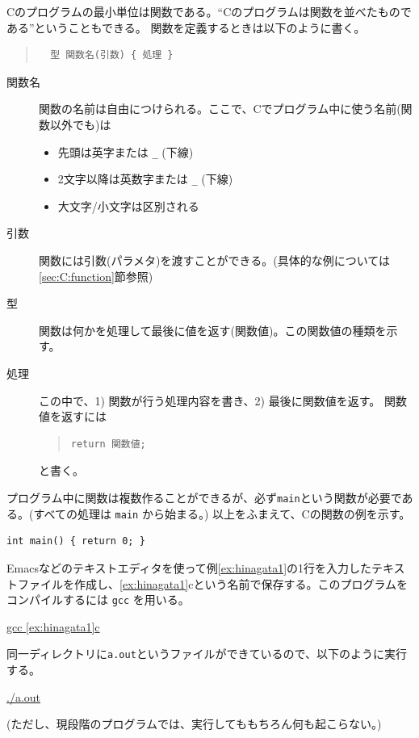Cのプログラムの最小単位は関数である。``Cのプログラムは関数を並べたものである''ということもできる。
関数を定義するときは以下のように書く。
%
\begin{quote}
  \begin{verbatim}
  型 関数名(引数) { 処理 }
  \end{verbatim}
\end{quote}
\begin{description}
\item[関数名] 関数の名前は自由につけられる。ここで、Cでプログラム中に使う名前(関数以外でも)は
  \begin{itemize}
  \item 先頭は英字または \verb+_+ (下線)
  \item 2文字以降は英数字または \verb+_+ (下線)
  \item 大文字/小文字は区別される
  \end{itemize}
\item[引数] 関数には引数(パラメタ)を渡すことができる。(具体的な例については\ref{sec:C:function}節参照)
\item[型] 関数は何かを処理して最後に値を返す(関数値)。この関数値の種類を示す。
\item[処理] この中で、1) 関数が行う処理内容を書き、2) 最後に関数値を返す。
  関数値を返すには
  \begin{quote}
\begin{verbatim}return 関数値;
\end{verbatim}
  \end{quote}
  と書く。
\end{description}
プログラム中に関数は複数作ることができるが、必ず\verb+main+という関数が必要である。(すべての処理は \verb+main+ から始まる。) 以上をふまえて、Cの関数の例を示す。
\begin{reidai}\label{ex:hinagata1}
\begin{verbatim}
int main() { return 0; }
\end{verbatim}
\end{reidai}

Emacsなどのテキストエディタを使って例\ref{ex:hinagata1}の1行を入力したテキストファイルを作成し、\ref{ex:hinagata1}cという名前で保存する。このプログラムをコンパイルするには \verb+gcc+ を用いる。
\begin{commandline2}
\prompt \underline{gcc \ref{ex:hinagata1}c}
\end{commandline2} \noindent
同一ディレクトリに{\tt a.out}というファイルができているので、以下のように実行する。
%
\begin{commandline2}
\prompt \underline{./a.out}
\end{commandline2} \noindent
(ただし、現段階のプログラムでは、実行してももちろん何も起こらない。)

